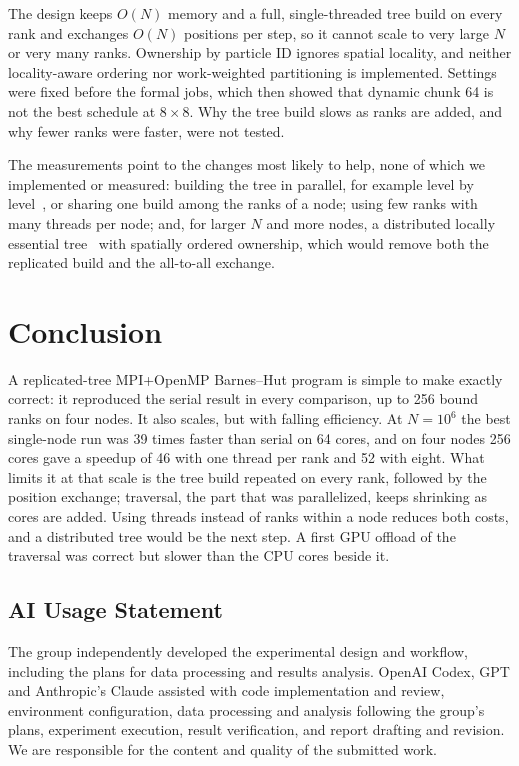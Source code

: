 \documentclass[10pt,a4paper,twocolumn,twoside]{rho-class/rho}
\begin{document}
The design keeps $O(N)$ memory and a full, single-threaded tree build on every rank and exchanges $O(N)$ positions per step, so it cannot scale to very large $N$ or very many ranks. Ownership by particle ID ignores spatial locality, and neither locality-aware ordering nor work-weighted partitioning is implemented. Settings were fixed before the formal jobs, which then showed that dynamic chunk 64 is not the best schedule at $8\times8$. Why the tree build slows as ranks are added, and why fewer ranks were faster, were not tested.

The measurements point to the changes most likely to help, none of which we implemented or measured: building the tree in parallel, for example level by level~\cite{Lecture12}, or sharing one build among the ranks of a node; using few ranks with many threads per node; and, for larger $N$ and more nodes, a distributed locally essential tree~\cite{WarrenSalmon1993} with spatially ordered ownership, which would remove both the replicated build and the all-to-all exchange.

\section{Conclusion}
A replicated-tree MPI+OpenMP Barnes--Hut program is simple to make exactly correct: it reproduced the serial result in every comparison, up to 256 bound ranks on four nodes. It also scales, but with falling efficiency. At $N=10^6$ the best single-node run was 39 times faster than serial on 64 cores, and on four nodes 256 cores gave a speedup of 46 with one thread per rank and 52 with eight. What limits it at that scale is the tree build repeated on every rank, followed by the position exchange; traversal, the part that was parallelized, keeps shrinking as cores are added. Using threads instead of ranks within a node reduces both costs, and a distributed tree would be the next step. A first GPU offload of the traversal was correct but slower than the CPU cores beside it.

\subsection{AI Usage Statement}
The group independently developed the experimental design and workflow, including the plans for data processing and results analysis. OpenAI Codex, GPT and Anthropic's Claude assisted with code implementation and review, environment configuration, data processing and analysis following the group's plans, experiment execution, result verification, and report drafting and revision. We are responsible for the content and quality of the submitted work.


\printbibliography
\end{document}
